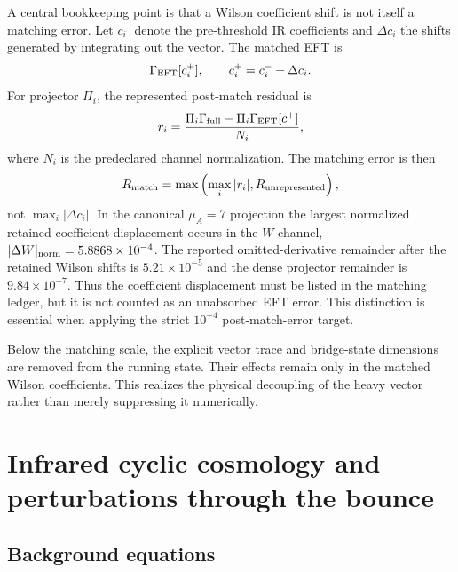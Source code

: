 \documentclass[12pt]{iopart}
\begin{document}
A central bookkeeping point is that a Wilson coefficient shift is not itself a matching error.  Let $c_i^-$ denote the pre-threshold IR coefficients and $\Delta c_i$ the shifts generated by integrating out the vector.  The matched EFT is
\begin{equation}
\Gamma_{\rm EFT}[c_i^+],\qquad c_i^+=c_i^-+\Delta c_i.
\end{equation}
For projector $\Pi_i$, the represented post-match residual is
\begin{equation}
r_i=\frac{\Pi_i\Gamma_{\rm full}-\Pi_i\Gamma_{\rm EFT}[c^+]}{N_i},
\label{eq:rmatch}
\end{equation}
where $N_i$ is the predeclared channel normalization.  The matching error is then
\begin{equation}
R_{\rm match}=\max\left(\max_i|r_i|,R_{\rm unrepresented}\right),
\label{eq:Rmatch}
\end{equation}
not $\max_i|\Delta c_i|$.  In the canonical $\mu_A=7$ projection the largest normalized retained coefficient displacement occurs in the $W$ channel, $|\Delta W|_{\rm norm}=5.8868\times10^{-4}$.  The reported omitted-derivative remainder after the retained Wilson shifts is $5.21\times10^{-5}$ and the dense projector remainder is $9.84\times10^{-7}$.  Thus the coefficient displacement must be listed in the matching ledger, but it is not counted as an unabsorbed EFT error.  This distinction is essential when applying the strict $10^{-4}$ post-match-error target.

Below the matching scale, the explicit vector trace and bridge-state dimensions are removed from the running state.  Their effects remain only in the matched Wilson coefficients.  This realizes the physical decoupling of the heavy vector rather than merely suppressing it numerically.

\section{Infrared cyclic cosmology and perturbations through the bounce}
\label{sec:cyclic}

\subsection{Background equations}
\end{document}
